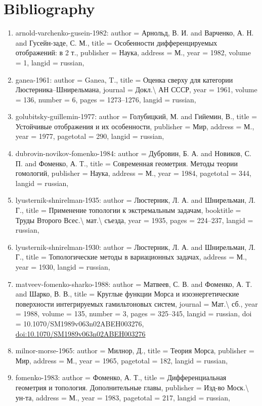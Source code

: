 \documentclass[11pt]{article}
\begin{document}
\section*{Bibliography}
\begin{enumerate}[leftmargin=*]
  \item arnold-varchenko-gusein-1982: author = Арнольд, В. И. and Варченко, А. Н. and Гусейн-заде, С. М., title = Особенности дифференцируемых отображений: в 2 т., publisher = Наука, address = М., year = 1982, volume = 1, langid = russian,
  \item ganea-1961: author = Ganea, T., title = Оценка сверху для категории Люстерника--Шнирельмана, journal = Докл.\textbackslash{} АН СССР, year = 1961, volume = 136, number = 6, pages = 1273--1276, langid = russian,
  \item golubitsky-guillemin-1977: author = Голубицкий, М. and Гийемин, В., title = Устойчивые отображения и их особенности, publisher = Мир, address = М., year = 1977, pagetotal = 290, langid = russian,
  \item dubrovin-novikov-fomenko-1984: author = Дубровин, Б. А. and Новиков, С. П. and Фоменко, А. Т., title = Современная геометрия. Методы теории гомологий, publisher = Наука, address = М., year = 1984, pagetotal = 344, langid = russian,
  \item lyusternik-shnirelman-1935: author = Люстерник, Л. А. and Шнирельман, Л. Г., title = Применение топологии к экстремальным задачам, booktitle = Труды Второго Всес.\textbackslash{} мат.\textbackslash{} съезда, year = 1935, pages = 224--237, langid = russian,
  \item lyusternik-shnirelman-1930: author = Люстерник, Л. А. and Шнирельман, Л. Г., title = Топологические методы в вариационных задачах, address = М., year = 1930, langid = russian,
  \item matveev-fomenko-sharko-1988: author = Матвеев, С. В. and Фоменко, А. Т. and Шарко, В. В., title = Круглые функции Морса и изоэнергетические поверхности интегрируемых гамильтоновых систем, journal = Мат.\textbackslash{} сб., year = 1988, volume = 135, number = 3, pages = 325--345, langid = russian, doi = 10.1070/SM1989v063n02ABEH003276, \href{https://doi.org/10.1070/SM1989v063n02ABEH003276}{doi:10.1070/SM1989v063n02ABEH003276}
  \item milnor-morse-1965: author = Милнор, Д., title = Теория Морса, publisher = Мир, address = М., year = 1965, pagetotal = 182, langid = russian,
  \item fomenko-1983: author = Фоменко, А. Т., title = Дифференциальная геометрия и топология. Дополнительные главы, publisher = Изд-во Моск.\textbackslash{} ун-та, address = М., year = 1983, pagetotal = 217, langid = russian,

\end{enumerate}
\end{document}
